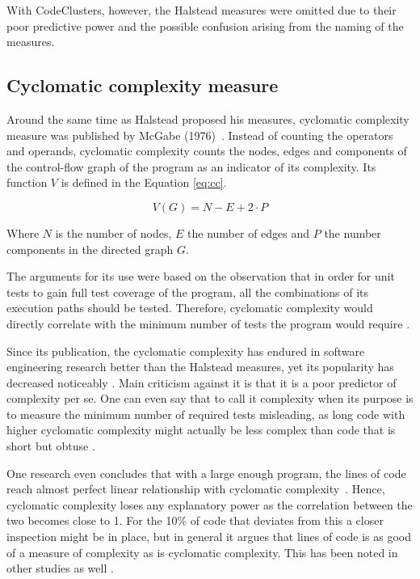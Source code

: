 With CodeClusters, however, the Halstead measures were omitted due to their poor predictive power and the possible confusion arising from the naming of the measures.

\subsection{Cyclomatic complexity measure}

Around the same time as Halstead proposed his measures, cyclomatic complexity measure was published by McGabe (1976)~\cite{mccabe-1976}. Instead of counting the operators and operands, cyclomatic complexity counts the nodes, edges and components of the control-flow graph of the program as an indicator of its complexity. Its function $V$ is defined in the Equation \ref{eq:cc}.

\vspace{-10pt}
\begin{equation}
\label{eq:cc}
    V(G)=N-E+2\cdot P
\end{equation}
\vspace{-10pt}

Where $N$ is the number of nodes, $E$ the number of edges and $P$ the number components in the directed graph $G$.

The arguments for its use were based on the observation that in order for unit tests to gain full test coverage of the program, all the combinations of its execution paths should be tested. Therefore, cyclomatic complexity would directly correlate with the minimum number of tests the program would require \cite{mccabe-1976}.

Since its publication, the cyclomatic complexity has endured in software engineering research better than the Halstead measures, yet its popularity has decreased noticeably \cite{halstead-in-oop-2004}. Main criticism against it is that it is a poor predictor of complexity per se. One can even say that to call it complexity when its purpose is to measure the minimum number of required tests misleading, as long code with higher cyclomatic complexity might actually be less complex than code that is short but obtuse \cite{shepperd-cc-1988}.

One research even concludes that with a large enough program, the lines of code reach almost perfect linear relationship with cyclomatic complexity~\cite{cc-is-loc}. Hence, cyclomatic complexity loses any explanatory power as the correlation between the two becomes close to 1. For the 10\% of code that deviates from this a closer inspection might be in place, but in general it argues that lines of code is as good of a measure of complexity as is cyclomatic complexity. This has been noted in other studies as well \cite{shepperd-cc-1988}.

